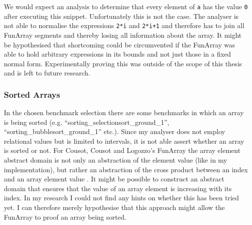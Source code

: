 \noindent We would expect an analysis to determine that every element of \texttt{a} has the value \texttt{0} after executing this snippet. Unfortunately this is not the case. The analyser is not able to normalise the expressions \texttt{2*i} and \texttt{2*i+1} and therefore has to join all FunArray segments and thereby losing all information about the array.
 It might be hypothesised that shortcoming could be circumvented if the FunArray was able to hold arbitrary expressions in its bounds and not just those in a fixed normal form. Experimentally proving this was outside of the scope of this thesis and is left to future research.
 

\subsubsection{Sorted Arrays}

In the chosen benchmark selection there are some benchmarks in which an array is being sorted (e.g. ``sorting\_selectionsort\_ground\_1'', ``sorting\_bubblesort\_\allowbreak{}ground\_1'' etc.). Since my analyser does not employ relational values but is limited to intervals, it is not able assert whether an array is sorted or not. 
 For Cousot, Cousot and Logozzo's FunArray the array element abstract domain is not only an abstraction of the element value (like in my implementation), but rather an abstraction of the cross product between an index and an array element value \cite{cousot2011}. It might be possible to construct an abstract domain that ensures that the value of an array element is increasing with its index. In my research I could not find any hints on whether this has been tried yet. I can therefore merely hypothesise that this approach might allow the FunArray to proof an array being sorted. 
 
 
 
 
 
 
 
 
 
 
 
 

